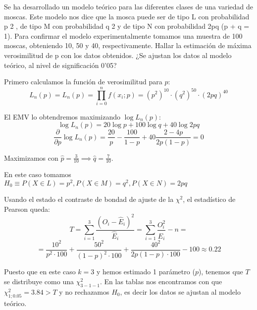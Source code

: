 \begin{problem}[6] Se ha desarrollado un modelo teórico para las diferentes clases de una variedad de moscas. Este
modelo nos dice que la mosca puede ser de tipo L con probabilidad p
2
, de tipo M con probabilidad
q
2 y de tipo N con probabilidad 2pq (p + q = 1). Para confirmar el modelo experimentalmente
tomamos una muestra de 100 moscas, obteniendo 10, 50 y 40, respectivamente.
\ppart
Hallar la estimación de máxima verosimilitud de p con los datos obtenidos.
\ppart
¿Se ajustan los datos al modelo teórico, al nivel de significación 0’05?
\solution


\spart
Primero calculamos la función de verosimilitud para $p$:
\[L_n(p) = L_n(p) = \prod_{i=0}^n f(x_i;p) = (p^2)^{10} · (q^2)^{50} · (2pq)^{40}\]

El EMV lo obtendremos maximizando $\log L_n(p)$:
\[\log L_n(p) = 20 \log p + 100 \log q + 40 \log 2pq\]
\[\frac{\partial}{\partial p} \log L_n(p) = \frac{20}{p} - \frac{100}{1-p} + 40 \frac{2-4p}{2p(1-p)} = 0 \]

Maximizamos con $\hat{p}=\frac{3}{10} \implies \hat{q}=\frac{7}{10}$.

\spart
En este caso tomamos $H_0 \equiv P(X∈L)=p^2, P(X∈M)=q^2, P(X∈N)=2pq$

Usando el estado el contraste de bondad de ajuste de la $χ^2$, el estadístico de Pearson queda:
\[T = \sum_{i=1}^3 \frac{\left(O_i - \hat{E}_i\right)^2}{\hat{E}_i} = \sum_{i=1}^3 \frac{O_i^2}{\hat{E}_i} - n =\]
\[ = \frac{10^2}{p^2·100} + \frac{50^2}{(1-p)^2 · 100} + \frac{40^2}{2p(1-p)·100} - 100 ≈ 0.22\]

Puesto que en este caso $k=3$ y hemos estimado 1 parámetro ($p$), tenemos que $T$ se distribuye como una $χ^2_{3-1-1}$. En las tablas nos encontramos con que $χ^2_{1;0.05}=3.84 > T$ y no rechazamos $H_0$, es decir los datos se ajustan al modelo teórico.

\end{problem}
